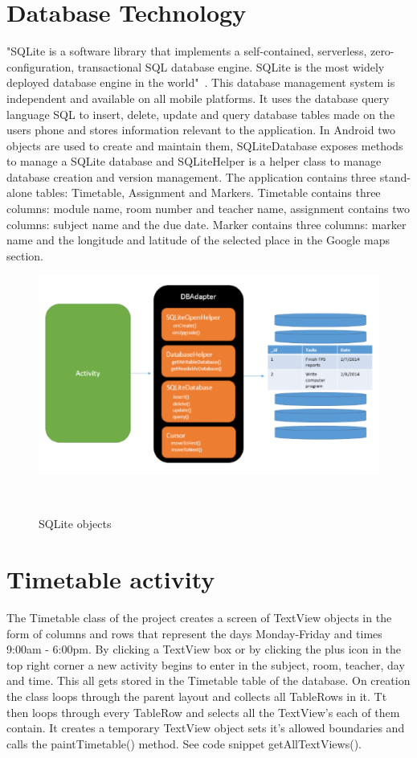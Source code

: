 \clearpage
\section{Database Technology}
"SQLite is a software library that implements a self-contained, serverless, zero-configuration, transactional SQL database engine. SQLite is the most widely deployed database engine in the world"~\cite{sqlite}. This database management system is independent and available on all mobile platforms. It uses the database query language SQL to insert, delete, update and query database tables made on the users phone and stores information relevant to the application. In Android two objects are used to create and maintain them, SQLiteDatabase exposes methods to manage a SQLite database and SQLiteHelper is a helper class to manage database creation and version management. The application contains three stand-alone tables: Timetable, Assignment and Markers. Timetable contains three columns: module name, room number and teacher name, assignment contains two columns: subject name and the due date. Marker contains three columns: marker name and the longitude and latitude of the selected place in the Google maps section.\newline

\begin{figure}[h]
	\includegraphics{img/Android-SQLite-Overview.png}
	\caption{SQLite objects}~\cite{using-the-sqlite-database}
\end{figure}

\section{Timetable activity}
The Timetable class of the project creates a screen of TextView objects in the form of columns and rows that represent the days Monday-Friday and times 9:00am - 6:00pm. By clicking a TextView box or by clicking the plus icon in the top right corner a new activity begins to enter in the subject, room, teacher, day and time. This all gets stored in the Timetable table of the database. On creation the class loops through the parent layout and collects all TableRows in it. Tt then loops through every TableRow and selects all the TextView's each of them contain. It creates a temporary TextView object sets it's allowed boundaries and calls the paintTimetable() method. See code snippet getAllTextViews().

